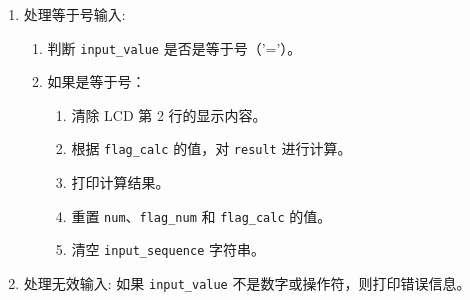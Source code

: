 \documentclass{theme-2639013-final}
\begin{document}
\begin{enumerate}
  \item 处理等于号输入:

    \begin{enumerate}
      \item 判断 \texttt{input\_value} 是否是等于号（'='）。
      \item 如果是等于号：
        \begin{enumerate}
          \item 清除 LCD 第 2 行的显示内容。
          \item 根据 \texttt{flag\_calc} 的值，对 \texttt{result} 进行计算。
          \item 打印计算结果。
          \item 重置 \texttt{num}、\texttt{flag\_num} 和 \texttt{flag\_calc} 的值。
          \item 清空 \texttt{input\_sequence} 字符串。
        \end{enumerate}
    \end{enumerate}
   
  \item 处理无效输入: 如果 \texttt{input\_value} 不是数字或操作符，则打印错误信息。
\end{enumerate}
\end{document}
